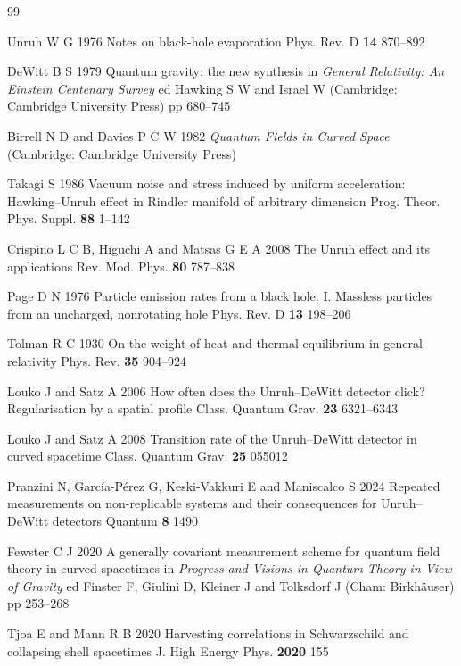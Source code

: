 \begin{thebibliography}{99}

Unruh W G 1976 Notes on black-hole evaporation Phys. Rev. D \textbf{14} 870--892

DeWitt B S 1979 Quantum gravity: the new synthesis in \emph{General Relativity: An Einstein Centenary Survey} ed Hawking S W and Israel W (Cambridge: Cambridge University Press) pp 680--745

Birrell N D and Davies P C W 1982 \emph{Quantum Fields in Curved Space} (Cambridge: Cambridge University Press)

Takagi S 1986 Vacuum noise and stress induced by uniform acceleration: Hawking--Unruh effect in Rindler manifold of arbitrary dimension Prog. Theor. Phys. Suppl. \textbf{88} 1--142

Crispino L C B, Higuchi A and Matsas G E A 2008 The Unruh effect and its applications Rev. Mod. Phys. \textbf{80} 787--838

Page D N 1976 Particle emission rates from a black hole. I. Massless particles from an uncharged, nonrotating hole Phys. Rev. D \textbf{13} 198--206

Tolman R C 1930 On the weight of heat and thermal equilibrium in general relativity Phys. Rev. \textbf{35} 904--924

Louko J and Satz A 2006 How often does the Unruh--DeWitt detector click? Regularisation by a spatial profile Class. Quantum Grav. \textbf{23} 6321--6343

Louko J and Satz A 2008 Transition rate of the Unruh--DeWitt detector in curved spacetime Class. Quantum Grav. \textbf{25} 055012

Pranzini N, Garc\'ia-P\'erez G, Keski-Vakkuri E and Maniscalco S 2024 Repeated measurements on non-replicable systems and their consequences for Unruh--DeWitt detectors Quantum \textbf{8} 1490

Fewster C J 2020 A generally covariant measurement scheme for quantum field theory in curved spacetimes in \emph{Progress and Visions in Quantum Theory in View of Gravity} ed Finster F, Giulini D, Kleiner J and Tolksdorf J (Cham: Birkh\"auser) pp 253--268

Tjoa E and Mann R B 2020 Harvesting correlations in Schwarzschild and collapsing shell spacetimes J. High Energy Phys. \textbf{2020} 155


\end{thebibliography}
